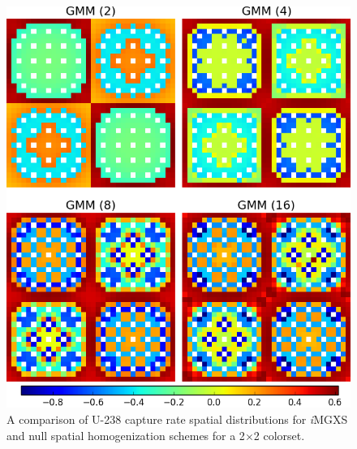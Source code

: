\begin{figure}[h!]
\centering
\includegraphics[width=0.9\linewidth]{figures/results/compare/2x2/compare-capt}
\vspace{2mm}
\caption[U-238 capture rate comparison for a 2$\times$2 colorset]{A comparison of U-238 capture rate spatial distributions for \textit{i}\ac{MGXS} and null spatial homogenization schemes for a 2$\times$2 colorset.}
\label{fig:chap11-assm-2x2-capt-rates}
\end{figure}

\clearpage

